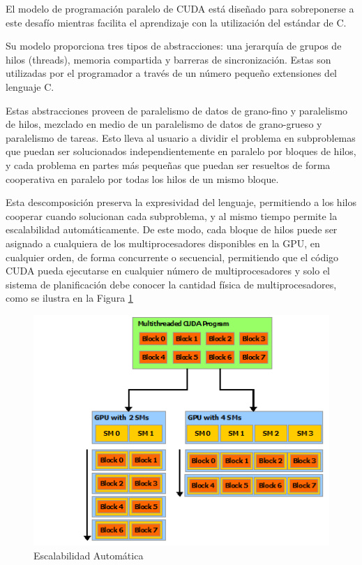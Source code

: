 \documentclass[a4paper,openright,12pt, oneside]{book}
\begin{document}
El modelo de programaci\'on paralelo de CUDA est\'a dise\~nado para sobreponerse a este
desaf\'io mientras facilita el aprendizaje con la utilizaci\'on del est\'andar de C.

Su modelo proporciona tres tipos de abstracciones: una jerarqu\'ia de grupos de hilos (threads),
memoria compartida y barreras de sincronizaci\'on. Estas son utilizadas por el programador
a trav\'es de un n\'umero peque\~no extensiones del lenguaje C.

Estas abstracciones proveen de paralelismo de datos de grano-fino y paralelismo de
hilos, mezclado en medio de un paralelismo de datos de grano-grueso y paralelismo de tareas.
Esto lleva al usuario a dividir el problema en subproblemas que puedan ser solucionados
independientemente en paralelo por bloques de hilos, y cada problema en partes m\'as
peque\~nas que puedan ser resueltos de forma cooperativa en paralelo por todas los
hilos de un mismo bloque.

Esta descomposici\'on preserva la expresividad del lenguaje, permitiendo a los hilos
cooperar cuando solucionan cada subproblema, y al mismo tiempo permite la escalabilidad
autom\'aticamente. De este modo, cada bloque de hilos puede ser asignado a cualquiera
de los multiprocesadores disponibles en la GPU, en cualquier orden, de forma concurrente
o secuencial, permitiendo que el c\'odigo CUDA pueda ejecutarse en cualquier n\'umero
de multiprocesadores y solo el sistema de planificaci\'on debe conocer la cantidad
f\'isica de multiprocesadores, como se ilustra en la Figura \ref{CUDA1}

\begin{figure}[!htbp]
  \begin{center}
    \leavevmode

    \includegraphics[]{automatic-scalability.png}

    \caption{Escalabilidad Autom\'atica}
    \label{CUDA1}
  \end{center}
\end{figure}
\end{document}
